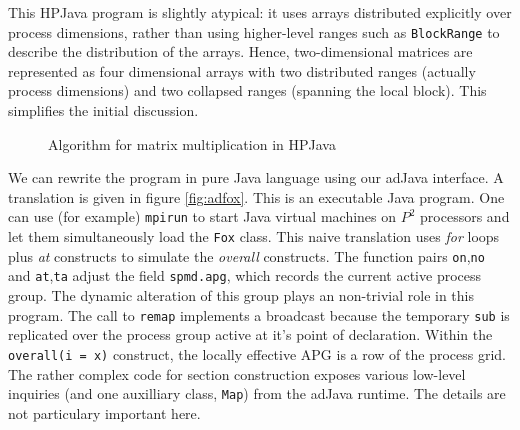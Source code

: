 This HPJava program is slightly atypical: it uses arrays distributed
explicitly over process dimensions, rather than using higher-level
ranges such as \texttt{BlockRange} to describe the distribution of the
arrays.  Hence, two-dimensional matrices are represented as four
dimensional arrays with two distributed ranges (actually process
dimensions) and two collapsed ranges (spanning the local block).  This
simplifies the initial discussion.

\begin{figure}[ht]
\caption{Algorithm for matrix multiplication in HPJava}
\label{fig:HPfox}
\end{figure}

We can rewrite the program in pure Java language using our adJava
interface.  A translation is given in figure \ref{fig:adfox}.  This is
an executable Java program.  One can use (for example) \texttt{mpirun}
to start Java virtual machines on $P^2$ processors and let them
simultaneously load the {\tt Fox} class.  This naive translation uses
{\em for} loops plus {\em at} constructs to simulate the
{\em overall} constructs.  The function pairs
\texttt{on},\texttt{no} and \texttt{at},\texttt{ta} adjust the field
\texttt{spmd.apg}, which records the current active process group.  The
dynamic alteration of this group plays an non-trivial role in this
program.  The call to {\tt remap} implements a broadcast because the
temporary {\tt sub} is replicated over the process group active at it's
point of declaration.  Within the {\tt overall(i = x)} construct, the
locally effective APG is a row of the process grid.
The rather complex code for section construction exposes various low-level
inquiries (and one auxilliary class, {\tt Map}) from the adJava
runtime.  The details are not particulary important here.

